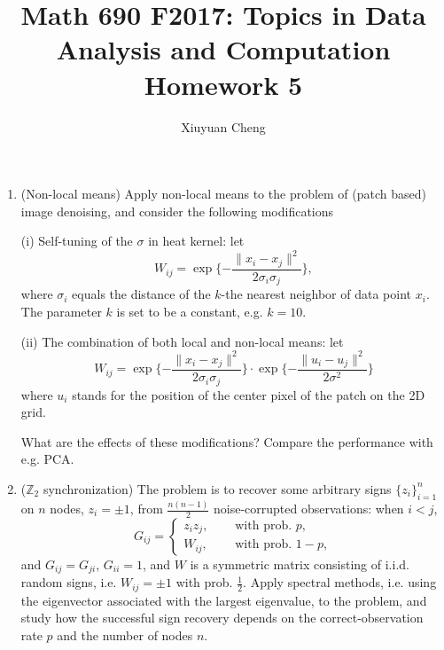 \documentclass[english]{article}
\begin{document}
\title{Math 690 F2017: Topics in Data Analysis and Computation\\
Homework 5}

\author{Xiuyuan Cheng}
\date{}

\maketitle

\begin{enumerate}

\item

(Non-local means)
Apply non-local means to the problem of (patch based) image denoising, and consider the following modifications

(i) Self-tuning of the $\sigma$ in heat kernel: let 
\[
W_{ij} = \exp \{ -\frac{ \| x_i - x_j\|^2}{ 2 \sigma_i \sigma_j}\},
\]
where $\sigma_i$ equals the distance of the $k$-the nearest neighbor of data point $x_i$.  The parameter $k$ is set to be a constant, e.g. $k=10$. 

(ii) The combination of both local and non-local means: let 
\[
W_{ij} = \exp \{ -\frac{ \| x_i - x_j\|^2}{ 2 \sigma_i \sigma_j}\}
              \cdot   \exp \{ -\frac{ \| u_i - u_j\|^2}{ 2 \sigma^2}\}
\]
where $u_i$ stands for the position of the center pixel of the patch on the 2D grid.

What are the effects of these modifications? Compare the performance with e.g. PCA.

\item

($\mathbb{Z}_2$ synchronization) 
The problem is to recover some arbitrary signs $\{z_i\}_{i=1}^n$ on $n$ nodes, $z_i = \pm 1$, from $\frac{n(n-1)}{2}$ noise-corrupted observations: when $i<j$,
\[
G_{ij} = \begin{cases}
 z_iz_j, & \quad \text{ with prob. $p$},\\
 W_{ij}, & \quad \text{ with prob. $1-p$},
\end{cases}
\]
and $G_{ij}=G_{ji}$, $G_{ii} =1$, and $W$ is a symmetric matrix consisting of i.i.d. random signs, i.e. $W_{ij} = \pm 1 $ with prob. $\frac{1}{2}$.
Apply spectral methods, i.e. using the eigenvector associated with the largest eigenvalue, 
to the problem, and study how the successful sign recovery depends on the correct-observation rate $p$ and the number of nodes $n$.



\end{enumerate}
\end{document}
